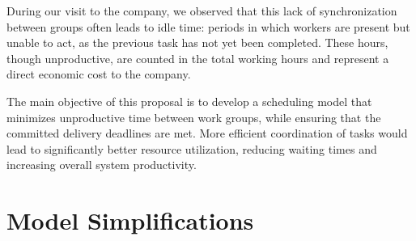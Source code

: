 During our visit to the company, we observed that this lack of synchronization between groups often leads to idle time: periods in which workers are present but unable to act,  
as the previous task has not yet been completed. These hours, though unproductive, are counted in the total working hours and represent a direct economic cost to the company.

The main objective of this proposal is to develop a scheduling model that minimizes unproductive time between work groups,  
while ensuring that the committed delivery deadlines are met. More efficient coordination of tasks would lead to significantly better resource utilization,  
reducing waiting times and increasing overall system productivity.


\section*{Model Simplifications}

